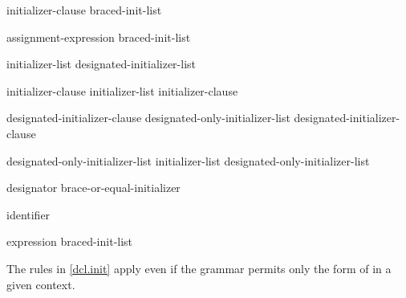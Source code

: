 \begin{bnf}
\br
    \terminal{=} initializer-clause\br
    braced-init-list
\end{bnf}

\begin{bnf}
\br
    assignment-expression\br
    braced-init-list
\end{bnf}

\begin{bnf}
\br
    \terminal{\{} initializer-list \opt{\terminal{,}} \terminal{\}}\br
    \terminal{\{} designated-initializer-list \opt{\terminal{,}} \terminal{\}}\br
    \terminal{\{} \terminal{\}}
\end{bnf}

\begin{bnf}
\br
    initializer-clause \br
    initializer-list \terminal{,} initializer-clause 
\end{bnf}

\begin{bnf}
\br
    designated-initializer-clause\br
    designated-only-initializer-list \terminal{,} designated-initializer-clause
\end{bnf}

\begin{bnf}
\br
    designated-only-initializer-list\br
    initializer-list \terminal{,} designated-only-initializer-list
\end{bnf}

\begin{bnf}
\br
    designator brace-or-equal-initializer
\end{bnf}

\begin{bnf}
\br
     identifier
\end{bnf}

\begin{bnf}
\br
    expression\br
    braced-init-list
\end{bnf}

\begin{note}
The rules in \ref{dcl.init} apply even if the grammar permits only
the  form
of  in a given context.
\end{note}

